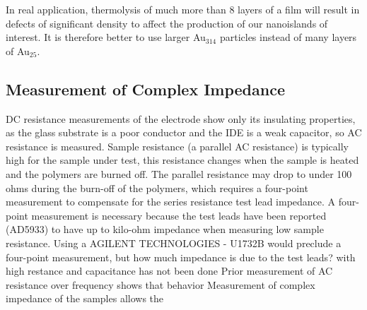 \documentclass[12pt,oneside,english]{article}
\begin{document}
	In real application, thermolysis of much more than 8 layers of a film will result in defects of  significant density to affect the production of our nanoislands of interest.  It is therefore better to use larger Au$_{314}$ particles instead of many layers of Au$_{25}$.

	\subsection{Measurement of Complex Impedance}
	DC resistance measurements of the electrode show only its insulating properties, as the glass substrate is a poor conductor and the IDE is a weak capacitor, so AC resistance is measured.
	Sample resistance (a parallel AC resistance) is typically high for the sample under test, this resistance changes when the sample is heated and the polymers are burned off.  
	The parallel resistance may drop to under 100 ohms during the burn-off of the polymers, which requires a four-point measurement to compensate for the series resistance test lead impedance.
	A four-point measurement is necessary because the test leads have been reported (AD5933) to have up to kilo-ohm impedance when measuring low sample resistance.
	Using a AGILENT TECHNOLOGIES - U1732B would preclude a four-point measurement, but how much impedance is due to the test leads?
	with high restance and capacitance has not been done
	Prior measurement of AC resistance over frequency shows that behavior
	Measurement of complex impedance of the samples allows the




\clearpage


\end{document}
